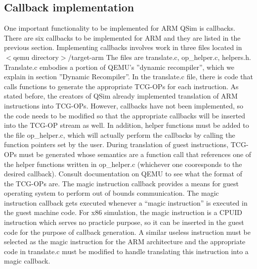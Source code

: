 \documentclass[letterpaper,11pt,twocolumn]{article}
\begin{document}
\subsection{Callback implementation}
One important functionality to be implemented for ARM QSim is callbacks. There are six callbacks to be implemented for ARM and they are listed in the previous section. Implementing callbacks involves work in three files located in
$<$qemu directory$>$/target-arm The files are translate.c, op\_helper.c, helpers.h. Translate.c embodies a portion of QEMU’s ''dynamic recompiler'', which we explain in section ''Dynamic Recompiler''. In the translate.c file, there is code that calls functions to generate the appropriate TCG-OPs for each instruction. As stated before, the creators of QSim already implemented translation of ARM instructions into TCG-OPs. However, callbacks have not been implemented, so the code needs to be modified so that the appropriate callbacks will be inserted into the TCG-OP stream as well. In addition, helper functions must be added to the file op\_helper.c, which will actually perform the callbacks by calling the  function pointers set by the user. During translation of guest instructions, TCG-OPs must be generated whose semantics are a function call that references one of the helper functions written in op\_helper.c (whichever one cooresponds to the desired callback). Consult documentation on QEMU to see what the format of the TCG-OPs are.
The magic instruction callback provides a means for guest operating system to perform out of bounds communication. The magic instruction callback gets executed whenever a “magic instruction” is executed in the guest machine code. For x86 simulation, the magic instruction is a CPUID instruction which serves no practicle purpose, so it can be inserted in the guest code for the purpose of callback generation. A similar useless instruction must be selected as the magic instruction for the ARM architecture and the appropriate code in translate.c must be modified to handle translating this instruction into a magic callback.
\end{document}
